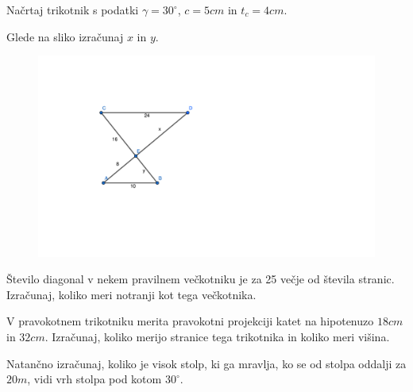 \documentclass{izpit}
\begin{document}
\naloga[\tocke{5}]
  Načrtaj trikotnik s podatki $\gamma =30^\circ$, $c=5cm$ in $t_c =4cm$.


  
\naloga[\tocke{5}]
  Glede na sliko izračunaj $x$ in $y$.
  \begin{figure}[H]
    \includegraphics[width=1\textwidth]{geogebra-export.pdf}
    \centering
\end{figure}
  \prostor[2]

\naloga*[\tocke{4}]
  Število diagonal v nekem pravilnem večkotniku je za 25 večje od števila stranic. Izračunaj, koliko meri notranji kot tega večkotnika.
  \prostor[1.5]


\naloga[\tocke{4}]
  V pravokotnem trikotniku merita pravokotni projekciji katet na hipotenuzo $18cm$ in $32cm$. Izračunaj, koliko merijo stranice tega trikotnika in koliko meri višina.
  \prostor[1]

\naloga*[\tocke{3}]
  Natančno izračunaj, koliko je visok stolp, ki ga mravlja, ko se od stolpa oddalji za $20m$, vidi vrh stolpa pod kotom $30^\circ$.
  \prostor[1]
\end{document}
